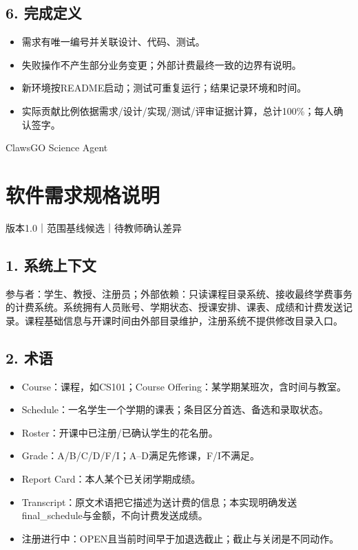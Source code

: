 \documentclass[UTF8,11pt,a4paper]{ctexart}
\providecommand{\tightlist}{\setlength{\itemsep}{0pt}\setlength{\parskip}{0pt}}
\begin{document}
\hypertarget{6-ux5b8cux6210ux5b9aux4e49}{%
\subsection{6. 完成定义}\label{6-ux5b8cux6210ux5b9aux4e49}}

\begin{itemize}
\tightlist
\item
  需求有唯一编号并关联设计、代码、测试。
\item
  失败操作不产生部分业务变更；外部计费最终一致的边界有说明。
\item
  新环境按README启动；测试可重复运行；结果记录环境和时间。
\item
  实际贡献比例依据需求/设计/实现/测试/评审证据计算，总计100\%；每人确认签字。
\end{itemize}

ClawsGO Science Agent

\clearpage
\hypertarget{ux8f6fux4ef6ux9700ux6c42ux89c4ux683cux8bf4ux660e}{%
\section{软件需求规格说明}\label{ux8f6fux4ef6ux9700ux6c42ux89c4ux683cux8bf4ux660e}}

版本1.0｜范围基线候选｜待教师确认差异

\hypertarget{1-ux7cfbux7edfux4e0aux4e0bux6587}{%
\subsection{1. 系统上下文}\label{1-ux7cfbux7edfux4e0aux4e0bux6587}}

参与者：学生、教授、注册员；外部依赖：只读课程目录系统、接收最终学费事务的计费系统。系统拥有人员账号、学期状态、授课安排、课表、成绩和计费发送记录。课程基础信息与开课时间由外部目录维护，注册系统不提供修改目录入口。

\hypertarget{2-ux672fux8bed}{%
\subsection{2. 术语}\label{2-ux672fux8bed}}

\begin{itemize}
\tightlist
\item
  Course：课程，如CS101；Course Offering：某学期某班次，含时间与教室。
\item
  Schedule：一名学生一个学期的课表；条目区分首选、备选和录取状态。
\item
  Roster：开课中已注册/已确认学生的花名册。
\item
  Grade：A/B/C/D/F/I；A--D满足先修课，F/I不满足。
\item
  Report Card：本人某个已关闭学期成绩。
\item
  Transcript：原文术语把它描述为送计费的信息；本实现明确发送final\_\allowbreak{}schedule与金额，不向计费发送成绩。
\item
  注册进行中：OPEN且当前时间早于加退选截止；截止与关闭是不同动作。
\end{itemize}
\end{document}
